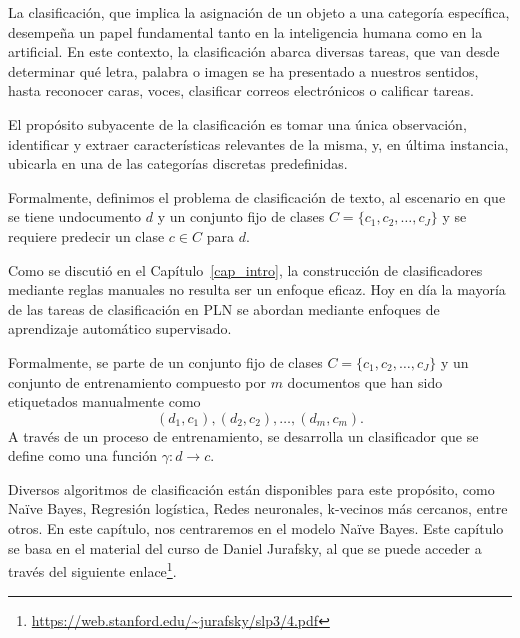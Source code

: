 \documentclass[11pt,fleqn]{book} %
\begin{document}
\pagestyle{empty} %

\tableofcontents %


\pagestyle{fancy} %





La clasificación, que implica la asignación de un objeto a una categoría específica, desempeña un papel fundamental tanto en la inteligencia humana como en la artificial. En este contexto, la clasificación abarca diversas tareas, que van desde determinar qué letra, palabra o imagen se ha presentado a nuestros sentidos, hasta reconocer caras, voces, clasificar correos electrónicos o calificar tareas. 

El propósito subyacente de la clasificación es tomar una única observación, identificar y extraer características relevantes de la misma, y, en última instancia, ubicarla en una de las categorías discretas predefinidas. 

\begin{definition}
Formalmente, definimos el problema de clasificación de texto, al escenario en que se tiene undocumento $d$ y un conjunto fijo de clases $C = \{c_1, c_2, \ldots, c_J\}$ y se requiere predecir un clase  $c \in C$ para $d$.
\end{definition}

Como se discutió en el Capítulo~\ref{cap_intro}, la construcción de clasificadores mediante reglas manuales no resulta ser un enfoque eficaz. Hoy en día la mayoría de las tareas de clasificación en PLN se abordan mediante enfoques de aprendizaje automático supervisado.

Formalmente, se parte de un conjunto fijo de clases $C = \{c_1, c_2, \ldots, c_J\}$ y un conjunto de entrenamiento compuesto por $m$ documentos que han sido etiquetados manualmente como
\[
(d_1, c_1), (d_2, c_2), \ldots, (d_m, c_m).
\]
A través de un proceso de entrenamiento, se desarrolla un clasificador que se define como una función $\gamma: d \to c$.

Diversos algoritmos de clasificación están disponibles para este propósito, como Naïve Bayes, Regresión logística, Redes neuronales, k-vecinos más cercanos, entre otros. En este capítulo, nos centraremos en el modelo Naïve Bayes. Este capítulo se basa en el material del curso de Daniel Jurafsky, al que se puede acceder a través del siguiente enlace\footnote{\url{https://web.stanford.edu/~jurafsky/slp3/4.pdf}}.
\end{document}
